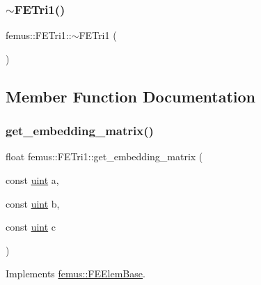 \mbox{\label{classfemus_1_1_f_e_tri1_ab002f6876ae1dfdd51a5127c8af66140}} 
\subsubsection{\texorpdfstring{$\sim$\+F\+E\+Tri1()}{~FETri1()}}
{\footnotesize\ttfamily femus\+::\+F\+E\+Tri1\+::$\sim$\+F\+E\+Tri1 (\begin{DoxyParamCaption}{ }\end{DoxyParamCaption})}



\subsection{Member Function Documentation}
\mbox{\label{classfemus_1_1_f_e_tri1_a6cbbc2c44efa0f45ae4cfe2c75d8011f}} 
\subsubsection{\texorpdfstring{get\+\_\+embedding\+\_\+matrix()}{get\_embedding\_matrix()}}
{\footnotesize\ttfamily float femus\+::\+F\+E\+Tri1\+::get\+\_\+embedding\+\_\+matrix (\begin{DoxyParamCaption}\item[{const \mbox{\hyperlink{_typedefs_8hpp_a91ad9478d81a7aaf2593e8d9c3d06a14}{uint}}}]{a,  }\item[{const \mbox{\hyperlink{_typedefs_8hpp_a91ad9478d81a7aaf2593e8d9c3d06a14}{uint}}}]{b,  }\item[{const \mbox{\hyperlink{_typedefs_8hpp_a91ad9478d81a7aaf2593e8d9c3d06a14}{uint}}}]{c }\end{DoxyParamCaption})\hspace{0.3cm}{\ttfamily [virtual]}}



Implements \mbox{\hyperlink{classfemus_1_1_f_e_elem_base_a0c4d6d5ec66bd4e301eb8ea2ef10f354}{femus\+::\+F\+E\+Elem\+Base}}.

